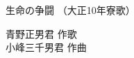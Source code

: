 \documentclass[10pt,b5j]{tarticle} %
\begin{document}
\begin{minipage}[c]{0.7\hsize} %
    \begin{center}
        {\LARGE
            生命の争闘 %
        }
        {\small 
            （大正10年寮歌） %
        }
    \end{center}
\end{minipage}
\begin{minipage}[c]{0.3\hsize} %
    \begin{flushright} %
        青野正男君 作歌\\小峰三千男君 作曲 %
    \end{flushright}
\end{minipage}
\end{document}

